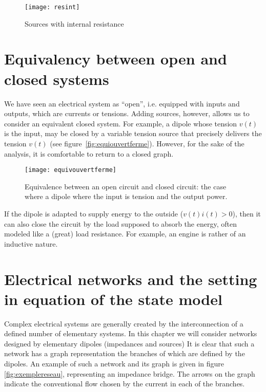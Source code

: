 \begin{figure}[t]
\begin{center}
\texttt{[image: resint]}
\caption{Sources with internal resistance}
\label{fig:resint}
\end{center}
\end{figure}



\section{Equivalency between open and closed systems}

We have seen an electrical system as “open”, i.e. equipped with inputs and outputs, which are currents or tensions.  Adding sources, however, allows us to consider an equivalent closed system.  For example, a dipole whose tension $v(t)$ is the input, may be closed by a variable tension source that precisely delivers the tension $v(t)$ (see figure~\ref{fig:equiouvertferme}).  However, for the sake of the analysis, it is comfortable to return to a closed graph.


\begin{figure}[htbp]
\begin{center}
\texttt{[image: equivouvertferme]}
\caption{Equivalence between an open circuit and closed circuit:  the case where a dipole where the input is tension and the output power.}
\label{fig:equivouvertferme}
\end{center}
\end{figure}

If the dipole is adapted to supply energy to the outside ($v(t) i(t) >0$), then it can also close the circuit by the load supposed to absorb the energy, often modeled like a (great) load resistance.  For example, an engine is rather of an inductive nature.

\section{Electrical networks and the setting in equation of the state model}

Complex electrical systems are generally created by the interconnection of a defined number of elementary systems.  In this chapter we will consider networks designed by elementary dipoles (impedances and sources)  It is clear that such a network has a graph representation the branches of which are defined by the dipoles.  An example of such a network and its graph is given in figure \ref{fig:exemplereseau}, representing an impedance bridge.  The arrows on the graph indicate the conventional flow chosen by the current in each of the branches.  

